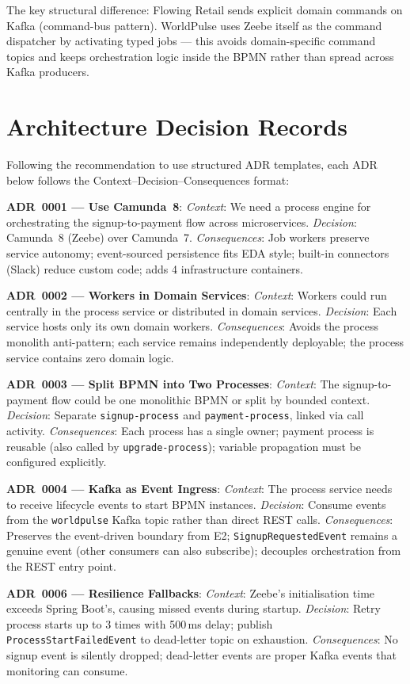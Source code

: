 \documentclass[10pt,a4paper]{article}
\begin{document}
The key structural difference: Flowing Retail sends explicit domain commands on Kafka (command-bus pattern). WorldPulse uses Zeebe itself as the command dispatcher by activating typed jobs --- this avoids domain-specific command topics and keeps orchestration logic inside the BPMN rather than spread across Kafka producers.


\section{Architecture Decision Records}

Following the recommendation to use structured ADR templates, each ADR below follows the Context--Decision--Consequences format:

\textbf{ADR~0001 --- Use Camunda~8}: \emph{Context}: We need a process engine for orchestrating the signup-to-payment flow across microservices. \emph{Decision}: Camunda~8 (Zeebe) over Camunda~7. \emph{Consequences}: Job workers preserve service autonomy; event-sourced persistence fits EDA style; built-in connectors (Slack) reduce custom code; adds 4 infrastructure containers.

\textbf{ADR~0002 --- Workers in Domain Services}: \emph{Context}: Workers could run centrally in the process service or distributed in domain services. \emph{Decision}: Each service hosts only its own domain workers. \emph{Consequences}: Avoids the process monolith anti-pattern; each service remains independently deployable; the process service contains zero domain logic.

\textbf{ADR~0003 --- Split BPMN into Two Processes}: \emph{Context}: The signup-to-payment flow could be one monolithic BPMN or split by bounded context. \emph{Decision}: Separate \texttt{signup-process} and \texttt{payment-process}, linked via call activity. \emph{Consequences}: Each process has a single owner; payment process is reusable (also called by \texttt{upgrade-process}); variable propagation must be configured explicitly.

\textbf{ADR~0004 --- Kafka as Event Ingress}: \emph{Context}: The process service needs to receive lifecycle events to start BPMN instances. \emph{Decision}: Consume events from the \texttt{worldpulse} Kafka topic rather than direct REST calls. \emph{Consequences}: Preserves the event-driven boundary from E2; \texttt{SignupRequestedEvent} remains a genuine event (other consumers can also subscribe); decouples orchestration from the REST entry point.

\textbf{ADR~0006 --- Resilience Fallbacks}: \emph{Context}: Zeebe's initialisation time exceeds Spring Boot's, causing missed events during startup. \emph{Decision}: Retry process starts up to 3 times with 500\,ms delay; publish \texttt{ProcessStartFailedEvent} to dead-letter topic on exhaustion. \emph{Consequences}: No signup event is silently dropped; dead-letter events are proper Kafka events that monitoring can consume.
\end{document}
